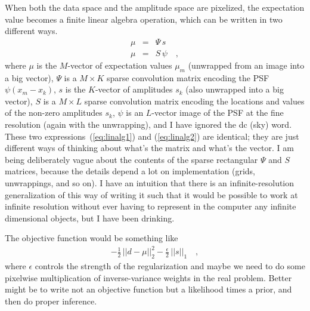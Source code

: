 \documentclass[12pt]{article}
\begin{document}
When both the data space and the amplitude space are pixelized, the
expectation value becomes a finite linear algebra operation, which can
be written in two different ways.
\begin{eqnarray}
\mu &=& \Psi\,s \label{eq:linalg1}
\\
\mu &=& S\,\psi \label{eq:linalg2}
\quad ,
\end{eqnarray}
where $\mu$ is the $M$-vector of expectation values $\mu_m$ (unwrapped
from an image into a big vector), $\Psi$ is a $M\times K$ sparse
convolution matrix encoding the PSF $\psi(x_m - x_k)$, $s$ is the
$K$-vector of amplitudes $s_k$ (also unwrapped into a big vector), $S$
is a $M\times L$ sparse convolution matrix encoding the locations and
values of the non-zero amplitudes $s_k$, $\psi$ is an $L$-vector image
of the PSF at the fine resolution (again with the unwrapping), and I
have ignored the dc (sky) word.
These two expressions~(\ref{eq:linalg1}) and (\ref{eq:linalg2}) are
identical; they are just different ways of thinking about what's the
matrix and what's the vector.
I am being deliberately vague about the contents of the sparse
rectangular $\Psi$ and $S$ matrices, because the details depend a lot
on implementation (grids, unwrappings, and so on).
I have an intuition that there is an infinite-resolution
generalization of this way of writing it such that it would be
possible to work at infinite resolution without ever having to
represent in the computer any infinite dimensional objects, but I have
been drinking.

The objective function would be something like
\begin{eqnarray}
-\frac{1}{2}\,||d - \mu||_2^2 - \frac{\epsilon}{2}\,||s||_1
\quad ,
\end{eqnarray}
where $\epsilon$ controls the strength of the regularization and maybe
we need to do some pixelwise multiplication of inverse-variance
weights in the real problem.
Better might be to write not an objective function but a likelihood
times a prior, and then do proper inference.
\end{document}
